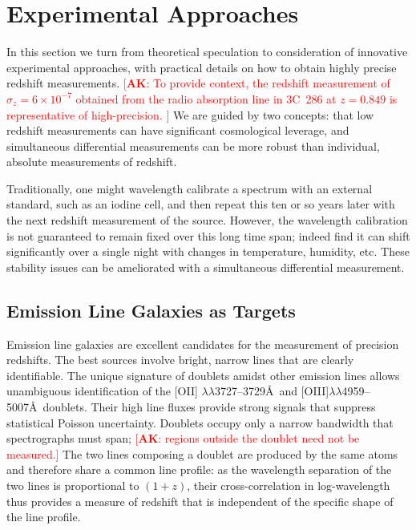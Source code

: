 \documentclass[preprint2, 10pt]{aastex}
\newcommand{\alex}[1]{\textcolor{red}{[{\bf AK}: #1]}}
\begin{document}
\section{Experimental Approaches} \label{sec:tech} 

In this section we turn from theoretical speculation to consideration of 
innovative experimental approaches, with practical details on how to 
obtain highly precise redshift measurements. 
\alex{
To provide context, the redshift measurement of  $\sigma_z=6\times 10^{-7}$ obtained
from the radio absorption line in 3C~286 at $z=0.849$
\citep{1978ApJ...219....1D} is representative of high-precision. 
} 
We are guided by two concepts: 
that low redshift measurements can have significant cosmological leverage, 
and simultaneous differential measurements can be more robust than 
individual, absolute measurements of redshift.  

Traditionally, one might wavelength calibrate a spectrum with an external 
standard, such as an iodine cell, and then repeat this ten or so years 
later with the next redshift measurement of the source.  However, the 
wavelength calibration is not guaranteed to remain fixed over this long time 
span; indeed \citet{griest1,griest2} find it can shift significantly over a 
single night with changes in temperature, humidity, etc.  These stability 
issues can be ameliorated with a simultaneous differential measurement. 




\subsection{Emission Line Galaxies as Targets} 

Emission line galaxies are excellent candidates for the measurement of 
precision redshifts. The best sources involve bright, narrow lines that 
are clearly identifiable. 
The unique signature
of doublets amidst  other emission lines allows unambiguous identification of the [OII] $\lambda\lambda$3727--3729\AA\ 
and [OIII]$\lambda\lambda$4959--5007\AA\ doublets.
Their high line fluxes provide strong signals that suppress statistical Poisson uncertainty.
Doublets occupy only a narrow bandwidth that spectrographs must span;
\alex{regions outside the doublet need not be measured.}
The two lines composing a doublet are produced by the same atoms and therefore
share a common line profile: as the wavelength separation of the two lines is proportional to $(1+z)$, their cross-correlation in log-wavelength
thus provides a measure of redshift that is independent of the specific shape of the line profile.
\end{document}
